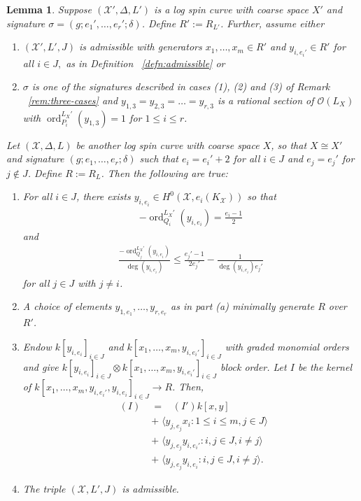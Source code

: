 \documentclass{amsart}
\theoremstyle{plain}
\newtheorem{lem}[thm]{Lemma}
\theoremstyle{definition}
\theoremstyle{remark}
\numberwithin{equation}{section}
\newcommand\sco{{\mathscr O}}
\DeclareMathOperator{\ord}{ord}
\newcommand\sx{\mathscr X}
\newcommand \subhalf[1]{\frac{{#1} - 1}{2{#1}}}
\newcommand{\halfcan}{L}
\DeclareMathOperator{\initial}{in_\prec}
\begin{document}
\begin{lem}
\label{lem:raise-stacky-order}
Suppose $(\sx', \Delta, \halfcan')$ is a log spin curve with coarse
space $X'$ and signature $\sigma = (g; e_1', \ldots, e_r'; \delta)$.  Define $R':= R_{\halfcan'}$.  Further, assume either 
\begin{enumerate}
	\item  $(\sx',\halfcan', J)$ is admissible with generators $x_1,\ldots, x_m \in R'$ and $y_{i, e_i'} \in R' $ for all $i \in J,$ as in Definition ~\ref{defn:admissible} or
	\item $\sigma$ is one of the signatures described in cases (1), (2) and (3) of Remark ~\ref{rem:three-cases} and $y_{1, 3} = y_{2,3} = \ldots= y_{r,3}$ is a rational section of $\sco(\halfcan_X)$ with $\ord_{P_i}^{\halfcan_X'}(y_{1,3}) = 1$ for $1 \leq  i \leq r$.
\end{enumerate}
Let
$(\sx, \Delta, \halfcan)$ be another log spin curve
with coarse space $X$, so that $X \cong X'$ and signature $(g; e_1, \ldots, e_r;
\delta)$ such that $e_i = e_i' + 2$ for all $i \in J$ and
$e_j = e_j'$ for $j \notin J$. Define $R := R_\halfcan$.  Then the following are true:
\begin{enumerate}
	\item[(a)] For all $i \in J$, there exists $y_{i, e_i} \in
		H^0(\sx, e_i(K_\sx))$ so that
		\begin{align*}
			-\ord_{Q_i}
^{\halfcan_X'}(y_{i, e_i}) = \frac{e_i - 1}{2}
		\end{align*}
		and
		\begin{align*}
			\frac{-\ord_{Q_j}
^{\halfcan_X'}(y_{i, e_i})}{\deg (y_{i, e_i})} \leq 
\subhalf{
			e_j'} - \frac{1}{\deg(y_{i, e_i})e_j'}
		\end{align*}
		for all $j \in J$ with $j \neq i$.
	\item[(b)] 
		A choice of elements $y_{1, e_1}, \ldots, y_{r, e_r}$ as in part (a) minimally
		generate $R$ over $R'$.
	\item[(c)] Endow $k[y_{i, e_i}]_{i\in J}$ and $ k[x_1,\ldots, x_m, y_{i, e_i'}]_{i\in J}$ with graded monomial orders and give 
$k[y_{i, e_i}]_{i\in J} \otimes k[x_1, \ldots, x_m, y_{i, e_i'}]_{i\in J}$
 block order.  Let $I$ be the kernel of $k[x_1, \ldots, x_m, y_{i, e_i'}, y_{i, e_i}]_{i\in J} \to R$.
  Then,
		\begin{align*}
			\initial(I) \;	&= \; \initial(I')k[x, y] \\
					&+ \; \langle y_{j, e_j}x_i  : 1\le i \le m, j\in J\rangle \\
					&+ \; \langle y_{j, e_j}y_{i, e_i'}: i,j\in J, i\ne j\rangle \\
					&+ \; \langle y_{j,e_j}y_{i,e_i}: i,j\in J, i\ne j\rangle.
		\end{align*}
	\item[(d)] The triple $(\sx, \halfcan', J)$ is admissible.
\end{enumerate}
\end{lem}
\end{document}

